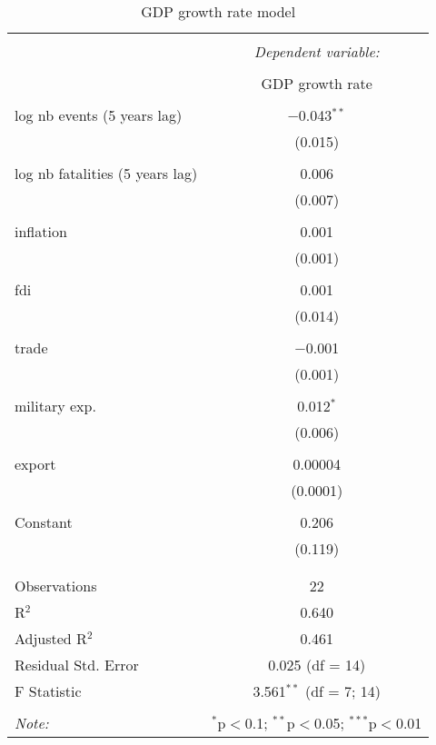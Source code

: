 
\begin{table}[!htbp] \centering 
  \caption{GDP growth rate model} 
  \label{} 
\begin{tabular}{@{\extracolsep{5pt}}lc} 
\\[-1.8ex]\hline 
\hline \\[-1.8ex] 
 & \multicolumn{1}{c}{\textit{Dependent variable:}} \\ 
\cline{2-2} 
\\[-1.8ex] & GDP growth rate \\ 
\hline \\[-1.8ex] 
 log nb events (5 years lag) & $-$0.043$^{**}$ \\ 
  & (0.015) \\ 
  & \\ 
 log nb fatalities (5 years lag) & 0.006 \\ 
  & (0.007) \\ 
  & \\ 
 inflation & 0.001 \\ 
  & (0.001) \\ 
  & \\ 
 fdi & 0.001 \\ 
  & (0.014) \\ 
  & \\ 
 trade & $-$0.001 \\ 
  & (0.001) \\ 
  & \\ 
 military exp. & 0.012$^{*}$ \\ 
  & (0.006) \\ 
  & \\ 
 export & 0.00004 \\ 
  & (0.0001) \\ 
  & \\ 
 Constant & 0.206 \\ 
  & (0.119) \\ 
  & \\ 
\hline \\[-1.8ex] 
Observations & 22 \\ 
R$^{2}$ & 0.640 \\ 
Adjusted R$^{2}$ & 0.461 \\ 
Residual Std. Error & 0.025 (df = 14) \\ 
F Statistic & 3.561$^{**}$ (df = 7; 14) \\ 
\hline 
\hline \\[-1.8ex] 
\textit{Note:}  & \multicolumn{1}{r}{$^{*}$p$<$0.1; $^{**}$p$<$0.05; $^{***}$p$<$0.01} \\ 
\end{tabular} 
\end{table} 
